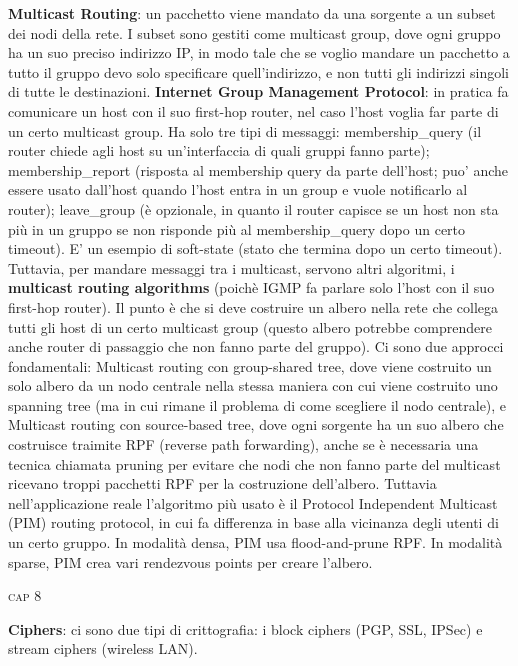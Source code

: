 \documentclass[a4paper,10pt]{article} %
\renewcommand{\b}[1]{%
    {\textbf{#1}}}
\begin{document}
\b{Multicast Routing}: un pacchetto viene mandato da una sorgente a un subset dei nodi della rete. I subset sono gestiti come multicast group, dove ogni gruppo ha un suo preciso indirizzo IP, in modo tale che se voglio mandare un pacchetto a tutto il gruppo devo solo specificare quell'indirizzo, e non tutti gli indirizzi singoli di tutte le destinazioni. \b{Internet Group Management Protocol}: in pratica fa comunicare un host con il suo first-hop router, nel caso l'host voglia far parte di un certo multicast group. Ha solo tre tipi di messaggi: membership\_query (il router chiede agli host su un'interfaccia di quali gruppi fanno parte); membership\_report (risposta al membership query da parte dell'host; puo' anche essere usato dall'host quando l'host entra in un group e vuole notificarlo al router); leave\_group (è opzionale, in quanto il router capisce se un host non sta più in un gruppo se non risponde più al membership\_query dopo un certo timeout). E' un esempio di soft-state (stato che termina dopo un certo timeout). Tuttavia, per mandare messaggi tra i multicast, servono altri algoritmi, i \b{multicast routing algorithms} (poichè IGMP fa parlare solo l'host con il suo first-hop router). Il punto è che si deve costruire un albero nella rete che collega tutti gli host di un certo multicast group (questo albero potrebbe comprendere anche router di passaggio che non fanno parte del gruppo). Ci sono due approcci fondamentali: Multicast routing con group-shared tree, dove viene costruito un solo albero da un nodo centrale nella stessa maniera con cui viene costruito uno spanning tree (ma in cui rimane il problema di come scegliere il nodo centrale), e Multicast routing con source-based tree, dove ogni sorgente ha un suo albero che costruisce traimite RPF (reverse path forwarding), anche se è necessaria una tecnica chiamata pruning per evitare che nodi che non fanno parte del multicast ricevano troppi pacchetti RPF per la costruzione dell'albero. Tuttavia nell'applicazione reale l'algoritmo più usato è il Protocol Independent Multicast (PIM) routing protocol, in cui fa differenza in base alla vicinanza degli utenti di un certo gruppo. In modalità densa, PIM usa flood-and-prune RPF. In modalità sparse, PIM crea vari rendezvous points per creare l'albero. 

\newpage

\vspace{3pt}
\centerline{\textsc{ \normalsize {cap 8}}}
\vspace{3pt}

\b{Ciphers}: ci sono due tipi di crittografia: i block ciphers (PGP, SSL, IPSec) e stream ciphers (wireless LAN).
\end{document}
